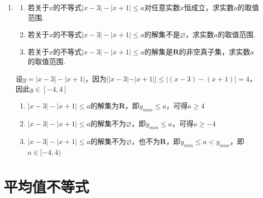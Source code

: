 \begin{enumerate}
\begin{jieda}
    \end{jieda}
    \item \begin{enumerate}
        \item 若关于$x$的不等式$|x-3|-|x+1| \leq a$对任意实数$x$恒成立，求实数$a$的取值范围.
        \item 若关于$x$的不等式$|x-3|-|x+1| \leq a$的解集不是$\varnothing$，求实数$a$的取值范围.
        \item 若关于$x$的不等式$|x-3|-|x+1| \leq a$的解集是$\mathbf{R}$的非空真子集，求实数$a$的取值范围.
    \end{enumerate}
    \begin{jieda}
        设$y = |x-3|-|x+1|$，因为$||x-3|-|x+1|| \leq |(x-3)-(x+1)| = 4$，因此$y \in [-4, 4]$
        \begin{enumerate}
            \item $|x-3|-|x+1| \leq a$的解集为$\mathbf{R}$，即$y_{max} \leq a$，可得$a \geq 4$
            \item $|x-3|-|x+1| \leq a$的解集不为$\varnothing$，即$y_{min} \leq a$，可得$a \geq -4$
            \item $|x-3|-|x+1| \leq a$的解集不为$\varnothing$，也不为$\mathbf{R}$，即$y_{min} \leq a < y_{max}$，即$a \in [-4, 4)$
        \end{enumerate}
    \end{jieda}
    
\end{enumerate}
\section*{平均值不等式}
